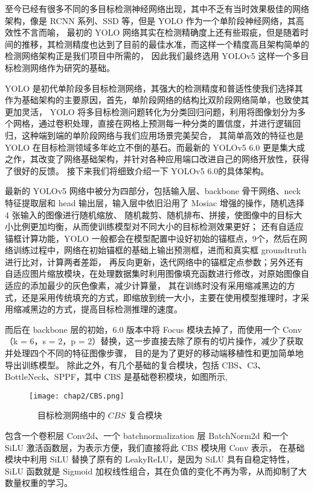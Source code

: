 至今已经有很多不同的多目标检测神经网络出现，其中不乏有当时效果极佳的网络架构，像是 RCNN 系列、SSD 等，但是 YOLO 作为一个单阶段神经网络，其高效性不言而喻，
最初的 YOLO 网络其实在检测精确度上还有些瑕疵，但是随着时间的推移，其检测精度也达到了目前的最佳水准，而这样一个精度高且架构简单的检测网络架构正是我们项目中所需的，
因此我们最终选用 YOLOv5 这样一个多目标检测网络作为研究的基础。

YOLO 是初代单阶段多目标检测网络，其强大的检测精度和普适性使我们选择其作为基础架构的主要原因，首先，单阶段网络的结构比双阶段网络简单，也致使其更加灵活，
YOLO 将多目标检测问题转化为分类回归问题，利用将图像划分为多个网格，通过卷积处理，直接在网格上预测每一种分类的置信度，并进行逻辑回归，这种端到端的单阶段网络与我们应用场景完美契合，
其简单高效的特征也是 YOLO 在目标检测领域多年屹立不倒的基石。而最新的 YOLOv5 6.0 更是集大成之作，其改变了网络基础架构，并针对各种应用端口改进自己的网络开放性，获得了很好的反馈。
接下来我们将细致介绍一下 YOLOv5 6.0的具体架构。

最新的 YOLOv5 网络中被分为四部分，包括输入层、backbone 骨干网络、neck 特征提取层和 head 输出层，输入层中依旧沿用了 Mosiac 增强的操作，随机选择 4 张输入的图像进行随机缩放、
随机裁剪、随机排布、拼接，使图像中的目标大小比例更加均衡，从而使训练模型对不同大小的目标检测效果更好；
还有自适应锚框计算功能，YOLO 一般都会在模型配置中设好初始的锚框点，9个，然后在网络训练过程中，网络在初始锚框的基础上输出预测框，进而和真实框 groundtruth 进行比对，计算两者差距，
再反向更新，迭代网络中的锚框定点参数；另外还有自适应图片缩放模块，在处理数据集时利用图像填充函数进行修改，对原始图像自适应的添加最少的灰色像素，减少计算量，
其在训练时没有采用缩减黑边的方式，还是采用传统填充的方式，即缩放到统一大小，主要在使用模型推理时，才采用缩减黑边的方式，提高目标检测推理的速度。

而后在 backbone 层的初始，6.0 版本中将 Focus 模块去掉了，而使用一个 Conv（k = 6，s = 2，p = 2）替换，这一步直接去除了原有的切片操作，减少了获取并处理四个不同的特征图像步骤，
目的是为了更好的移动端移植性和更加简单地导出训练模型。
除此之外，有几个基础的复合模块，包括 CBS、C3、BottleNeck、SPPF，其中 CBS 是基础卷积模块，如图所示,
\vspace{3mm}
\begin{figure}[h]
	\centering
	\texttt{[image: chap2/CBS.png]}
	\caption{\ \ 目标检测网络中的 $CBS$ 复合模块}
	\label{fig2-1}
\end{figure}
\vspace{3mm}

包含一个卷积层 Conv2d、一个 batchnormalization 层 BatchNorm2d 和一个 SiLU 激活函数层，为表示方便，我们直接将此 CBS 模块用 Conv 表示，
在基础模块中利用 SiLU 替换了原有的 LeakyReLU，是因为 SiLU 具有自稳定特性，SiLU 函数就是 Sigmoid 加权线性组合，其在负值的变化不再为零，从而抑制了大数量权重的学习。

